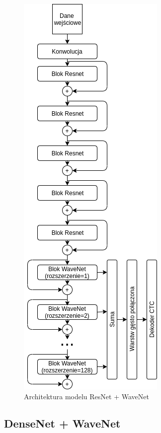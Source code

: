 \documentclass[a4paper,11pt,twoside]{report}
\theoremstyle{definition}
\begin{document}
\begin{figure}[h!]
	\centering
	\includegraphics[scale=0.7]{resnetWavenet}
	\caption{Architektura modelu ResNet + WaveNet}
\end{figure}

\subsection{DenseNet + WaveNet}
\end{document}
